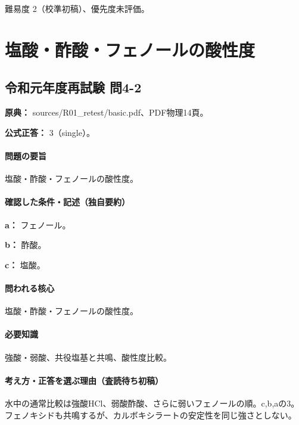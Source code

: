 \par 難易度 2（校準初稿）、優先度未評価。

\section{塩酸・酢酸・フェノールの酸性度}

\subsection{令和元年度再試験 問4-2}
\label{q:r01-ret-basic-4-2}

\noindent\textbf{原典：} sources/R01\_retest/basic.pdf、PDF物理14頁。

\textbf{公式正答：} 3（single）。

\paragraph{問題の要旨} 塩酸・酢酸・フェノールの酸性度。

\paragraph{確認した条件・記述（独自要約）}\mbox{}\par

\noindent\textbf{a：} フェノール。\par

\noindent\textbf{b：} 酢酸。\par

\noindent\textbf{c：} 塩酸。\par

\paragraph{問われる核心} 塩酸・酢酸・フェノールの酸性度。

\paragraph{必要知識} 強酸・弱酸、共役塩基と共鳴、酸性度比較。

\paragraph{考え方・正答を選ぶ理由（査読待ち初稿）} 水中の通常比較は強酸HCl、弱酸酢酸、さらに弱いフェノールの順。c,b,aの3。フェノキシドも共鳴するが、カルボキシラートの安定性を同じ強さとしない。

